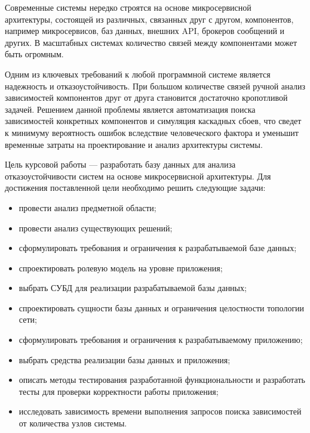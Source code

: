 
Современные системы нередко строятся на основе микросервисной~\cite{ref:microservice-arch} 
архитектуры, состоящей из различных, связанных друг с другом, компонентов, например
микросервисов, баз данных, внешних API, брокеров сообщений и других.
В масштабных системах количество связей между компонентами может быть огромным.

Одним из ключевых требований к любой программной системе является надежность
и отказоустойчивость. При большом количестве связей ручной анализ зависимостей
компонентов друг от друга становится достаточно кропотливой задачей.
Решением данной проблемы является автоматизация поиска зависимостей конкретных
компонентов и симуляция каскадных сбоев, что сведет к минимуму вероятность ошибок
вследствие человеческого фактора и уменьшит временные затраты на проектирование
и анализ архитектуры системы.

Цель курсовой работы --- разработать базу данных для анализа отказоустойчивости
систем на основе микросервисной архитектуры.
Для достижения поставленной цели необходимо решить следующие задачи:
\begin{itemize}
    \item провести анализ предметной области;
    \item провести анализ существующих решений;
    \item сформулировать требования и ограничения к разрабатываемой базе данных;
    \item спроектировать ролевую модель на уровне приложения;
    \item выбрать СУБД для реализации разрабатываемой базы данных;
    \item спроектировать сущности базы данных и ограничения целостности топологии сети;
    \item сформулировать требования и ограничения к разрабатываемому приложению;
    \item выбрать средства реализации базы данных и приложения;
    \item описать методы тестирования разработанной функциональности и разработать тесты
        для проверки корректности работы приложения;
    \item исследовать зависимость времени выполнения запросов поиска зависимостей
        от количества узлов системы.
\end{itemize}
